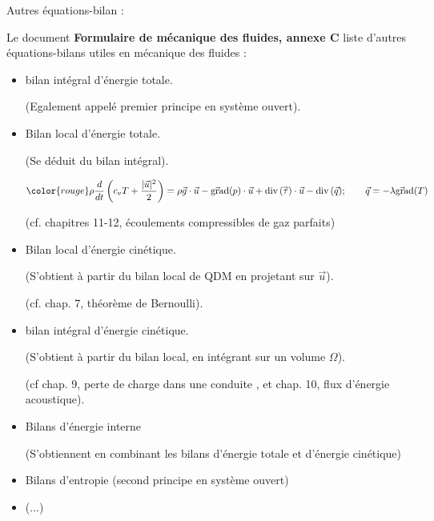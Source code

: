 \begin{frame}{Autres équations-bilan :}
\small

Le document {\bf Formulaire de mécanique des fluides, annexe C} liste d'autres équations-bilans utiles en mécanique des fluides :

\begin{itemize}

 \item bilan intégral d'énergie totale.  
 
 {\color{gris} (Egalement appelé premier principe en système ouvert).}
 

 \item Bilan local d'énergie totale.  
 
  {\color{gris} (Se déduit du bilan intégral).}
 
 \begin{equation}
\color{rouge}
		\rho \ddt{} \left( c_v T + \frac{|\vec{u}|^2}{2} \right) 
		= \rho \vec{g} \cdot \vec{u} 
		- \gradient ( p) \cdot  \vec{u}  
		+ \divergence ( \mytensor{\tau}) \cdot \vec{u}  
		 - \divergence(\vec{q}) ; \qquad \vec{q} = - \lambda \gradient(T)
\end{equation}


  (cf. chapitres 11-12, écoulements compressibles de gaz parfaits)
 
 
 
\item Bilan local d'énergie cinétique. 

{\color{gris} (S'obtient à partir du bilan local de QDM en projetant sur $\vec{u}$).}

(cf. chap. 7, théorème de Bernoulli).


\item bilan intégral d'énergie cinétique. 

{\color{gris} (S'obtient à partir du bilan local, en intégrant sur un volume $\Omega$).}

(cf chap. 9, perte de charge dans une conduite , et chap. 10, flux d'énergie acoustique).
 

 
 \item Bilans d'énergie interne 
 
 {\color{gris} (S'obtiennent en combinant les bilans d'énergie totale et d'énergie cinétique)}
 
 \item Bilans d'entropie (second principe en système ouvert)
 
 \item (...)
 
 \end{itemize}





\end{frame}

